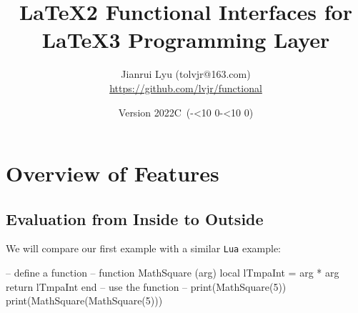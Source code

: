\documentclass[oneside]{book}
\newcommand*{\myversion}{2022C}
\newcommand*{\mydate}{Version \myversion\ (\the\year-\mylpad\month-\mylpad\day)}
\newcommand*{\mylpad}[1]{\ifnum#1<10 0\the#1\else\the#1\fi}
\begin{document}
\title{\sffamily LaTeX2 \textcolor{green3}{Functional} Interfaces for LaTeX3 Programming Layer}
\author{Jianrui Lyu (tolvjr@163.com)\\\url{https://github.com/lvjr/functional}}
\date{\mydate\vspace{1cm}\\\myabstract\vspace{10cm}}

\newcommand\myabstract{\parbox{\linewidth}{\hrule\vspace{0.8em}\large
LaTeX3 programming layer (\textsf{expl3}) is very powerful for advanced users,
but it is a little complicated for normal users.
This \textcolor{green3}{\sffamily functional} package aims to provide
intuitive LaTeX2 functional interfaces for it.
\par\vspace{0.5em}
Although there are functions in LaTeX3, the evaluation of them is from outside to inside.
With this package, the evaluation of functions is from inside to outside,
which is the same as other programming languages such as \texttt{JavaScript} or \texttt{Lua}.
In this way, it is rather easy to debug code too.
\par\vspace{0.5em}
Note that many paragraphs in this manual are copied from the documentation of \textsf{expl3}.
\par\vspace{0.8em}\hrule}}

{\let\newpage\relax\vspace{-4cm}\maketitle}

\tableofcontents

\chapter{Overview of Features}

\section{Evaluation from Inside to Outside}

We will compare our first example with a similar \verb!Lua! example:

\begin{minipage}{0.55\textwidth}
\begin{codehigh}
\IgnoreSpacesOn
\PrgNewFunction {} {
  \IntSet {}
  \Result { \Value \lTmpaInt }
}
\IgnoreSpacesOff
{}
\end{codehigh}
\end{minipage}%
\begin{minipage}{0.45\textwidth}
\begin{code}
-- define a function --
function MathSquare (arg)
  local lTmpaInt = arg * arg
  return lTmpaInt
end
-- use the function --
print(MathSquare(5))
print(MathSquare(MathSquare(5)))
\end{code}
\end{minipage}
\end{document}

